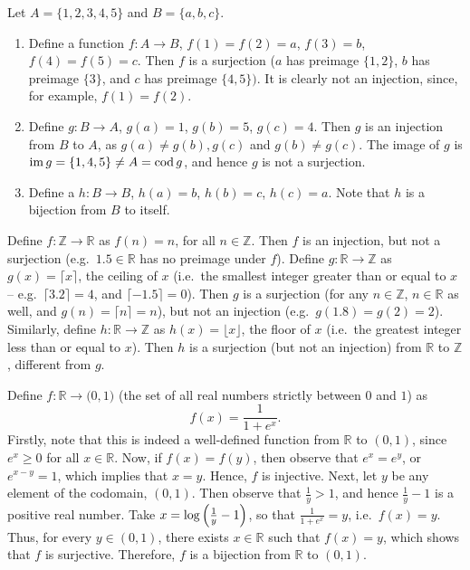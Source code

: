 \begin{Example}
Let $A = \{1, 2, 3, 4, 5\}$ and $B = \{a, b, c\}$.
\begin{enumerate}
\item Define a function $f \colon A \to B$, $f(1) = f(2) = a$, $f(3) = b$, $f(4) = f(5) = c$. Then $f$ is a surjection ($a$ has preimage $\{1, 2\}$, $b$ has preimage $\{3\}$, and $c$ has preimage $\{4, 5\})$. It is clearly not an injection, since, for example, $f(1) = f(2)$.

\item Define $g \colon B \to A$, $g(a) = 1$, $g(b) = 5$, $g(c) = 4$. Then $g$ is an injection from $B$ to $A$, as $g(a) \ne g(b), g(c)$ and $g(b) \ne g(c)$. The image of $g$ is $\operatorname{im} g = \{1, 4, 5\} \ne A = \operatorname{cod} g$, and hence $g$ is not a surjection.

\item Define a $h \colon B \to B$, $h(a) = b$, $h(b) = c$, $h(c) = a$. Note that $h$ is a bijection from $B$ to itself.
\end{enumerate}
\end{Example}

\begin{Example}
Define $f \colon \mathbb Z \to \mathbb R$ as $f(n) = n$, for all $n \in \mathbb Z$. Then $f$ is an injection, but not a surjection (e.g.\ $1.5 \in \mathbb R$ has no preimage under $f$). Define $g \colon \mathbb R \to \mathbb Z$ as $g(x) = \lceil x \rceil$, the ceiling of $x$ (i.e.\ the smallest integer greater than or equal to $x$ -- e.g.\ $\lceil 3.2 \rceil = 4$, and $\lceil -1.5 \rceil = 0$). Then $g$ is a surjection (for any $n \in \mathbb Z$, $n \in \mathbb R$ as well, and $g(n) = \lceil n \rceil = n$), but not an injection (e.g.\ $g(1.8) = g(2) = 2$). Similarly, define $h \colon \mathbb R \to \mathbb Z$ as $h(x) = \lfloor x \rfloor$, the floor of $x$ (i.e.\ the greatest integer less than or equal to $x$). Then $h$ is a surjection (but not an injection) from $\mathbb R$ to $\mathbb Z$, different from $g$.
\end{Example}

\begin{Example}\label{ex:RIsom01}
Define $f \colon \mathbb R \to \mathbb (0,1)$ (the set of all real numbers strictly between $0$ and $1$) as
\begin{equation*}
f(x) = \dfrac{1}{1 + e^x}.
\end{equation*}
Firstly, note that this is indeed a well-defined function from $\mathbb R$ to $(0, 1)$, since $e^x \ge 0$ for all $x \in \mathbb R$. Now, if $f(x) = f(y)$, then observe that $e^x = e^y$, or $e^{x - y} = 1$, which implies that $x = y$. Hence, $f$ is injective. Next, let $y$ be any element of the codomain, $(0, 1)$. Then observe that $\frac 1 y > 1$, and hence $\frac 1 y - 1$ is a positive real number. Take $x = \log\pqty{\frac 1 y - 1}$, so that $\frac 1 {1 + e^x} = y$, i.e.\ $f(x) = y$. Thus, for every $y \in (0, 1)$, there exists $x \in \mathbb R$ such that $f(x) = y$, which shows that $f$ is surjective. Therefore, $f$ is a bijection from $\mathbb R$ to $(0, 1)$.
\end{Example}

